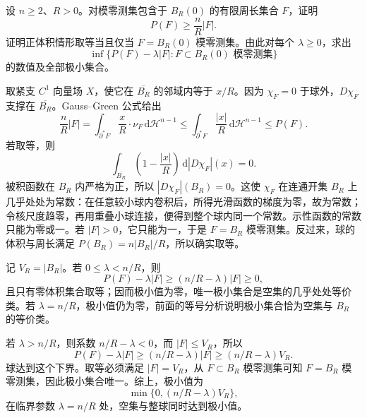 \begin{exercise}\label{g3:ex:ball-perimeter-volume-penalty}
	设 \(n\ge2\)、\(R>0\)。对模零测集包含于 \(B_R(0)\) 的有限周长集合 \(F\)，证明
	\[
		P(F)\ge\frac nR|F|.
	\]
	证明正体积情形取等当且仅当 \(F=B_R(0)\) 模零测集。由此对每个 \(\lambda\ge0\)，求出
	\[
		\inf\{P(F)-\lambda|F|:F\subset B_R(0)\text{ 模零测集}\}
	\]
	的数值及全部极小集合。
\end{exercise}
\begin{solution}
	取紧支 \(C^1\) 向量场 \(X\)，使它在 \(\overline{B_R}\) 的邻域内等于 \(x/R\)。因为 \(\chi_F=0\) 于球外，\(D\chi_F\) 支撑在 \(\overline{B_R}\)。Gauss--Green 公式给出
	\[
		\frac nR|F|
		=\int_{\partial^*F}\frac xR\cdot\nu_F\,\mathrm d\mathcal H^{n-1}
		\le\int_{\partial^*F}\frac{|x|}R\,\mathrm d\mathcal H^{n-1}
		\le P(F).
	\]
	若取等，则
	\[
		\int_{\overline{B_R}}\left(1-\frac{|x|}R\right)\,\mathrm d|D\chi_F|(x)=0.
	\]
	被积函数在 \(B_R\) 内严格为正，所以 \(|D\chi_F|(B_R)=0\)。这使 \(\chi_F\) 在连通开集 \(B_R\) 上几乎处处为常数：在任意较小球内卷积后，所得光滑函数的梯度为零，故为常数；令核尺度趋零，再用重叠小球连接，便得到整个球内同一个常数。示性函数的常数只能为零或一。若 \(|F|>0\)，它只能为一，于是 \(F=B_R\) 模零测集。反过来，球的体积与周长满足 \(P(B_R)=n|B_R|/R\)，所以确实取等。

	记 \(V_R=|B_R|\)。若 \(0\le\lambda<n/R\)，则
	\[
		P(F)-\lambda|F|\ge(n/R-\lambda)|F|\ge0,
	\]
	且只有零体积集合取等；因而极小值为零，唯一极小集合是空集的几乎处处等价类。若 \(\lambda=n/R\)，极小值仍为零，前面的等号分析说明极小集合恰为空集与 \(B_R\) 的等价类。

	若 \(\lambda>n/R\)，则系数 \(n/R-\lambda<0\)，而 \(|F|\le V_R\)，所以
	\[
		P(F)-\lambda|F|
		\ge(n/R-\lambda)|F|
		\ge(n/R-\lambda)V_R.
	\]
	球达到这个下界。取等必须满足 \(|F|=V_R\)，从 \(F\subset B_R\) 模零测集可知 \(F=B_R\) 模零测集，因此极小集合唯一。综上，极小值为
	\[
		\min\{0,(n/R-\lambda)V_R\},
	\]
	在临界参数 \(\lambda=n/R\) 处，空集与整球同时达到极小值。
\end{solution}
